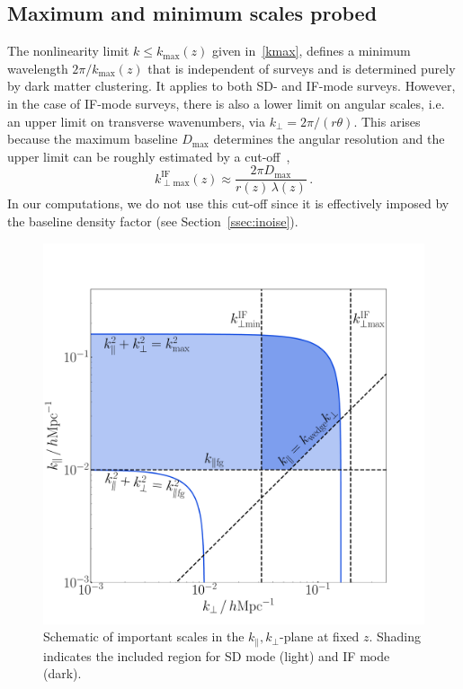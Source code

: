 \subsection{Maximum and minimum scales probed}
%
The nonlinearity limit $k\leq k_\mathrm{max}(z)$ given in~\eqref{kmax}, defines a minimum wavelength $2\pi/ k_\mathrm{max}(z)$ that is independent of surveys and is determined purely by dark matter clustering. It applies to both SD- and IF-mode surveys.
However, in the case of IF-mode surveys, there is also a lower limit on angular scales, i.e. an upper limit on transverse wavenumbers, via $k_\perp=2\pi/(r\theta)$. This arises because the maximum baseline $D_\mathrm{max}$ determines the  angular resolution  and the upper limit can be roughly estimated by a cut-off~\cite{Bull:2014rha,Alonso:2017dgh,Karagiannis:2019jjx,Durrer:2020orn},
\begin{equation} \label{kifmax}
k_{\perp \mathrm{max}}^\mathrm{IF}(z) \approx \frac{2\pi D_\mathrm{max}}{r(z)\,\lambda(z)}\,.
\end{equation}
In our computations, we do not use this cut-off since it is effectively imposed by the baseline density factor (see Section~\ref{ssec:inoise}).
\begin{figure}[ht]
\centering
\includegraphics[width=.49\textwidth]{fig/kplane}
\caption{Schematic of important scales in the $k_\|,k_\perp$-plane at fixed $z$. Shading indicates the included region for SD mode (light) and IF mode (dark).}\label{kplane}
\end{figure}


